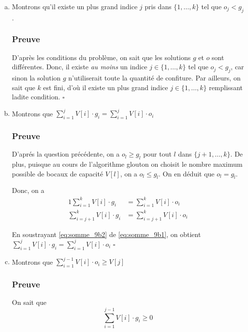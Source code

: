 \documentclass[12pt,a4paper]{article}
\begin{document}
\begin{enumerate}[a)]
 \item Montrons qu'il existe un plus grand indice $j$ pris dans $\{1,\dotsc,k\}$ tel que $o_j < g_j$.
 
 \subsubsection*{Preuve}
 D'apr\`es les conditions du probl\`eme, on sait que les solutions $g$ et $o$ sont diff\'erentes. Donc, il existe {\itshape au moins} un indice $j \in \{1,\dotsc,k\}$ tel que $o_j < g_j$, car sinon la solution $g$ n'utiliserait toute la quantit\'e de confiture. Par ailleurs, on sait que $k$ est fini, d'o\`u il existe un plus grand indice $j \in \{1,\dotsc,k\}$ remplissant ladite condition. \hfill\ensuremath{\square}
 
 \item Montrons que \( \displaystyle\sum_{i=1}^{j} V[i]\cdot g_i = \displaystyle\sum_{i=1}^{j} V[i]\cdot o_i\)
 
 \subsubsection*{Preuve}
 D'apr\'es la question pr\'ec\'edente, on a $o_l \geq g_l$ pour tout $l$ dans $\{j+1,\dotsc, k\}$. De plus, puisque au cours de l'algorithme glouton on choisit le nombre maximum possible de bocaux de capacit\'e $V[l]$, on a $o_l \leq g_l$. On en d\'eduit que $o_l = g_l$.
 
 Donc, on a
 \begin{alignat}{1}
    \displaystyle\sum_{i=1}^{k} V[i]\cdot g_i &= \displaystyle\sum_{i=1}^{k} V[i]\cdot o_i \label{eq:somme_9b1} \\
    \displaystyle\sum_{i=j+1}^{k} V[i]\cdot g_i &= \displaystyle\sum_{i=j+1}^{k} V[i]\cdot o_i \label{eq:somme_9b2}
 \end{alignat}
 
 En soustrayant \eqref{eq:somme_9b2} de \eqref{eq:somme_9b1}, on obtient \( \displaystyle\sum_{i=1}^{j} V[i]\cdot g_i = \displaystyle\sum_{i=1}^{j} V[i]\cdot o_i\) \hfill\ensuremath{\square}
 
 \item Montrons que \( \displaystyle\sum_{i=1}^{j-1} V[i]\cdot o_i \geq V[j]\)
 
 \subsubsection*{Preuve}
 On sait que 
 \begin{equation*}
    \displaystyle\sum_{i=1}^{j-1} V[i]\cdot g_i \geq 0
 \end{equation*}


\end{enumerate}
\end{document}
